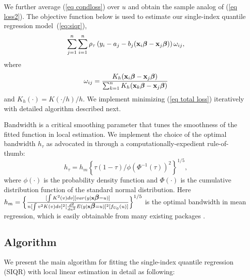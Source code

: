We further average (\ref{eq condloss}) over $u$ and obtain the sample analog of (\ref{eq loss2}). The objective function below is used to estimate our single-index quantile regression model~(\ref{eq:siqr}),
\begin{equation} \label{eq total loss}
\sum_{j=1}^n\sum_{i=1}^n\rho_\tau\left(y_i-a_j-b_j({\bf x}_i\mbox{\boldmath$\beta$}-{\bf x}_j\mbox{\boldmath$\beta$})\right)\omega_{ij},
\end{equation}
where 
\begin{equation} \label{eq wij} \omega_{ij}=\frac{K_h({\bf x}_i\mbox{\boldmath$\beta$}-{\bf x}_j\mbox{\boldmath$\beta$})}{\sum_{k=1}^n K_h({\bf x}_k\mbox{\boldmath$\beta$}-{\bf x}_j\mbox{\boldmath$\beta$})}
\end{equation}
and $K_h(\cdot)=K(\cdot/h)/h.$
We implement minimizing (\ref{eq total loss}) iteratively with detailed algorithm described next.

Bandwidth is a critical smoothing parameter that tunes the smoothness of the fitted function in local estimation. We implement the choice of the optimal bandwidth  $h_\tau$ as advocated in \cite{wu_single-index_2010} through a computationally-expedient rule-of-thumb:
\begin{equation}\label{eq approx hp}
h_{\tau}=h_m\left\{\tau(1-\tau)/\phi\left(\Phi^{-1}(\tau)\right)^2\right\}^{1/5},
\end{equation}
where $\phi(\cdot)$ is the probability density function and $\Phi(\cdot)$ is the cumulative distribution function of the standard normal distribution. Here $h_m= \Bigl\{ \frac{[ \int K^2(v)dv ] [var(y|{\bf x}\mbox{\boldmath$\beta$}=u)]}{n [ \int v^2 K(v)dv ]^2 [\frac{d^2}{d u^2}E(y|{\bf x}\mbox{\boldmath$\beta$}=u)]^2 [f_{U_0}(u)]} \Bigr\}^{1/5}$ is the optimal bandwidth in mean regression, which is easily obtainable from many existing packages \citep{ruppert_effective_1995}. 

\subsection{Algorithm}

We present the main algorithm for fitting the single-index quantile regression (SIQR) with local linear estimation in detail as following: 

